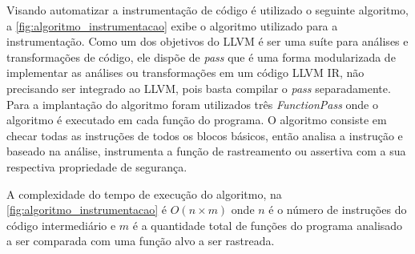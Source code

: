 Visando automatizar a instrumentação de código é utilizado o seguinte 
algoritmo, a \autoref{fig:algoritmo_instrumentacao} exibe o algoritmo utilizado para a instrumentação. Como um dos objetivos do LLVM é ser uma suíte para análises e transformações de código\cite{Lattner:2004}, ele dispõe de \textit{pass} que é uma forma modularizada de implementar as análises ou transformações em um código LLVM IR, não precisando ser integrado ao LLVM, pois basta compilar o \textit{pass} separadamente. Para a implantação do algoritmo foram utilizados três \textit{FunctionPass} onde o algoritmo é executado em cada função do programa. O algoritmo consiste em checar todas as instruções de todos os blocos básicos, então analisa a instrução e baseado na análise, instrumenta 
a função de rastreamento ou assertiva com a sua respectiva propriedade de segurança. 

A complexidade do tempo de execução do algoritmo, na \autoref{fig:algoritmo_instrumentacao} é $O(n \times m)$ onde $n$ é o número de instruções do código intermediário e $m$ é a quantidade total de funções do programa analisado a ser comparada com uma função alvo a ser rastreada.


